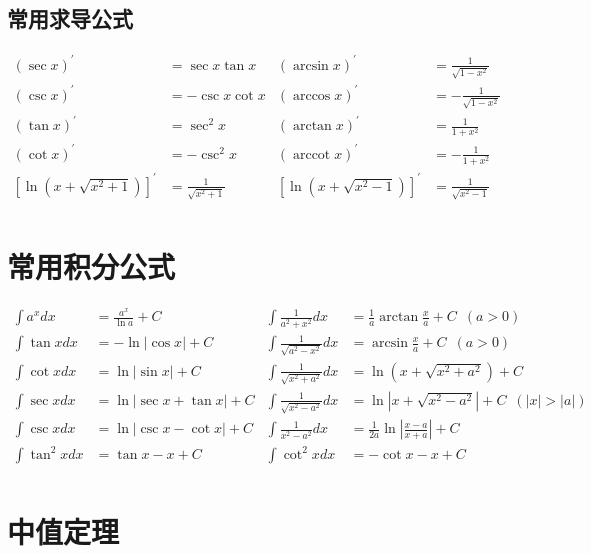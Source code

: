 ﻿\documentclass[a4paper,12pt,UTF8]{ctexart}
\begin{document}
    \subsection{常用求导公式}
    \begin{align*}
        (\sec x)^{'}& = \sec x\tan x& (\arcsin x)^{'}& = \frac{1}{\sqrt{1-x^{2}}}&\\
        (\csc x)^{'}& = -\csc x\cot x& (\arccos x)^{'}& = -\frac{1}{\sqrt{1-x^{2}}}&\\
        (\tan x)^{'}& = \sec^{2}x& (\arctan x)^{'}& = \frac{1}{1+x^{2}}&\\
        (\cot x)^{'}& = -\csc^{2}x& (\operatorname{arccot} x)^{'}& = -\frac{1}{1+x^{2}}&\\
        [\ln(x+\sqrt{x^{2}+1})]^{'}& = \frac{1}{\sqrt{x^{2}+1}}& [\ln(x+\sqrt{x^{2}-1})]^{'}& = \frac{1}{\sqrt{x^{2}-1}}&\\
    \end{align*}

    \section{常用积分公式}
    \begin{align*}
        \int {a}^{x} dx& = \frac{{a}^{x}}{\ln a}+C& \int \frac{1}{a^{2}+x^{2}}dx& = \frac{1}{a}\arctan\frac{x}{a}+C \enspace (a>0)&\\
        \int \tan x dx& = -\ln \left|\cos x \right|+C& \int \frac{1}{\sqrt{a^{2}-x^{2}}}dx& = \arcsin\frac{x}{a}+C \enspace (a>0)&\\
        \int \cot x dx& = \ln \left|\sin x \right|+C& \int \frac{1}{\sqrt{x^{2}+a^{2}}}dx& = \ln\left(x+\sqrt{x^{2}+a^{2}}\right)+C&\\
        \int \sec x dx& = \ln \left|\sec x + \tan x \right|+C& \int \frac{1}{\sqrt{x^{2}-a^{2}}}dx& = \ln\left|x+\sqrt{x^{2}-a^{2}}\right|+C \enspace (\left|x\right|>\left|a\right|)&\\
        \int \csc x dx& = \ln \left|\csc x - \cot x \right|+C& \int \frac{1}{x^{2}-a^{2}}dx& = \frac{1}{2a}\ln\left|\frac{x-a}{x+a}\right|+C&\\
        \int \tan^2 x dx& = \tan x-x+C& \int \cot^2 x dx& = -\cot x-x+C& \\
    \end{align*}

    \section{中值定理}
\end{document}

